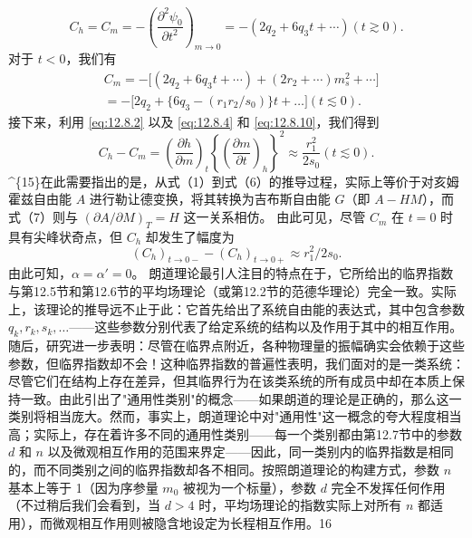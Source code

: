 \begin{equation}\tag{12.9.12}\label{eq:12.9.12}
C _ { h } = C _ { m } = - \left( \frac { \partial ^{2} \psi _ { 0 } } { \partial t ^{2} } \right) _ { m \rightarrow 0 } = - ( 2 q _ { 2 } + 6 q _ { 3 } t + \cdots )  ( t \gtrsim 0 ) .
\end{equation}
对于 \(t < 0\)，我们有
\begin{equation}\tag{12.9.13}\label{eq:12.9.13}
\begin{array}{rl} & { C _ { m } = - \Big [ ( 2 q _ { 2 } + 6 q _ { 3 } t + \cdots ) + ( 2 r _ { 2 } + \cdots ) m _ { s } ^{2} + \cdots \Big ] } \\& { = - \Big [ 2 q _ { 2 } + \{ 6 q _ { 3 } - ( r _ { 1 } r _ { 2 } / s _ { 0 } ) \} t + \ldots \Big ]  ( t \lesssim 0 ) . } \end{array}
\end{equation}
接下来，利用 \autoref{eq:12.8.2} 以及 \autoref{eq:12.8.4} 和 \autoref{eq:12.8.10}，我们得到
\begin{equation}\tag{12.9.14}\label{eq:12.9.14}
C _ { h } - C _ { m } = \left( \frac { \partial h } { \partial m } \right) _ { t } \left\{ \left( \frac { \partial m } { \partial t } \right) _ { h } \right\} ^{2} \approx \frac { r _ { 1 } ^{2} } { 2 s _ { 0 } }  ( t \lesssim 0 ) .
\end{equation}
\^{}\{15\}在此需要指出的是，从式（1）到式（6）的推导过程，实际上等价于对亥姆霍兹自由能 \(A\) 进行勒让德变换，将其转换为吉布斯自由能 \(G\)（即 \(A-HM\)），而式（7）则与 \((\partial A/\partial M)_{T}=H\) 这一关系相仿。
由此可见，尽管 \(C_{m}\) 在 \(t=0\) 时具有尖峰状奇点，但 \(C_{h}\) 却发生了幅度为
\begin{equation}\tag{12.9.15}\label{eq:12.9.15}
( C _ { h } ) _ { t \rightarrow 0 - } - ( C _ { h } ) _ { t \rightarrow 0 + } \approx r _ { 1 } ^{2} / 2 s _ { 0 } .
\end{equation}
由此可知，\(\alpha = \alpha' = 0\)。
朗道理论最引人注目的特点在于，它所给出的临界指数与第12.5节和第12.6节的平均场理论（或第12.2节的范德华理论）完全一致。实际上，该理论的推导远不止于此：它首先给出了系统自由能的表达式，其中包含参数 \(q_k, r_k, s_k, \ldots\)——这些参数分别代表了给定系统的结构以及作用于其中的相互作用。随后，研究进一步表明：尽管在临界点附近，各种物理量的振幅确实会依赖于这些参数，但临界指数却不会！这种临界指数的普遍性表明，我们面对的是一类系统：尽管它们在结构上存在差异，但其临界行为在该类系统的所有成员中却在本质上保持一致。由此引出了"通用性类别"的概念——如果朗道的理论是正确的，那么这一类别将相当庞大。然而，事实上，朗道理论中对"通用性"这一概念的夸大程度相当高；实际上，存在着许多不同的通用性类别——每一个类别都由第12.7节中的参数 \(d\) 和 \(n\) 以及微观相互作用的范围来界定——因此，同一类别内的临界指数是相同的，而不同类别之间的临界指数却各不相同。按照朗道理论的构建方式，参数 \(n\) 基本上等于 1（因为序参量 \(m_0\) 被视为一个标量），参数 \(d\) 完全不发挥任何作用（不过稍后我们会看到，当 \(d > 4\) 时，平均场理论的指数实际上对所有 \(n\) 都适用），而微观相互作用则被隐含地设定为长程相互作用。16
